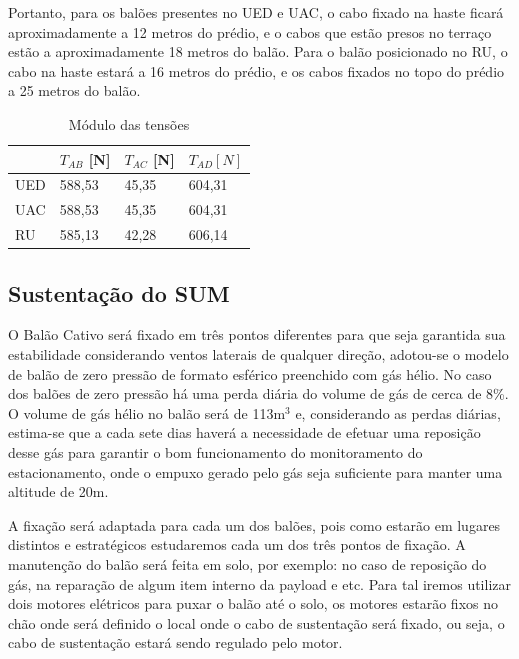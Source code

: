 Portanto, para os balões presentes no UED e UAC, o cabo fixado na haste ficará aproximadamente a 12 metros do prédio, e o cabos que estão presos no terraço estão a aproximadamente 18 metros do balão. Para o balão posicionado no RU, o cabo na haste estará a 16 metros do prédio, e os cabos fixados no topo do prédio a 25 metros do balão.

\begin{table}[H]
\centering
\begin{tabular}{l|l|l|l|}
\cline{2-4}
 & $T_{AB}$ [N] & $T_{AC}$ [N] & $T_{AD} [N]$ \\ \hline
\multicolumn{1}{|l|}{UED} & 588,53 & 45,35 & 604,31 \\ \hline
\multicolumn{1}{|l|}{UAC} & 588,53 & 45,35 & 604,31 \\ \hline
\multicolumn{1}{|l|}{RU} & 585,13 & 42,28 & 606,14 \\ \hline
\end{tabular}
\caption{ Módulo das tensões}
\label{table:modTensoes}
\end{table}

\subsection{Sustentação do SUM}

O Balão Cativo será fixado em três pontos diferentes para que seja garantida sua estabilidade considerando ventos laterais de qualquer direção, adotou-se o modelo de balão de zero pressão de formato esférico preenchido com gás hélio. No caso dos balões de zero pressão há uma perda diária do volume de gás de cerca de 8\%. O volume de gás hélio no balão será de 113m$^{3}$ e, considerando as perdas diárias, estima-se que a cada sete dias haverá a necessidade de  efetuar uma reposição desse gás para garantir o bom funcionamento do monitoramento do estacionamento, onde o empuxo gerado pelo gás seja suficiente para manter uma altitude de 20m.

A fixação será adaptada para cada um dos balões, pois como estarão em lugares distintos e estratégicos estudaremos cada um dos três pontos de fixação. A manutenção do balão será feita em solo, por exemplo: no caso de reposição do gás, na reparação de algum item interno da payload e etc. Para tal iremos utilizar dois motores elétricos para puxar o balão até o solo, os motores estarão fixos no chão onde será definido o local onde o cabo de sustentação será fixado, ou seja, o cabo de sustentação estará sendo regulado pelo motor.

